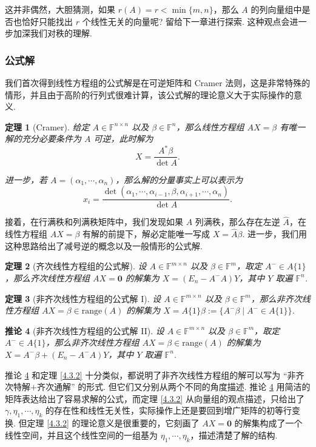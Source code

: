 \documentclass[10pt,openany]{article}
\theoremstyle{thmstyle} %
\newtheorem{theorem}{定理}[subsection]
\theoremstyle{defstyle} %
\newtheorem{corollary}[theorem]{推论}
\theoremstyle{prostyle} %
\theoremstyle{exastyle}
\theoremstyle{remstyle}
\newcommand{\F}{\mathbb{F}}
\newcommand{\n}{^{n \times n}}
\newcommand{\mn}{^{m \times n}}
\begin{document}
这并非偶然，大胆猜测，如果 \( r(A)=r<\min\{m,n\} \)，那么 \( A \) 的列向量组中是否也恰好只能找出 \( r \) 个线性无关的向量呢? 留给下一章进行探索. 这种观点会进一步加深我们对秩的理解.
 
\subsubsection{公式解}

我们首次得到线性方程组的公式解是在可逆矩阵和 Cramer 法则，这是非常特殊的情形，并且由于高阶的行列式很难计算，该公式解的理论意义大于实际操作的意义.

\begin{theorem}[Cramer]
	给定 \( A \in \F\n \) 以及 \( \beta \in \F^n \)，那么线性方程组 \( AX=\beta \) 有唯一解的充分必要条件为 \( A \) 可逆，此时解为
	\[ X=\frac{A^*\beta}{\det A}. \]
	
	进一步，若 \( A=(\alpha_1,\cdots,\alpha_n) \)，那么解的分量事实上可以表示为
	\[ x_i=\frac{\det(\alpha_1,\cdots,\alpha_{i-1},\beta,\alpha_{i+1},\cdots,\alpha_n)}{\det A}. \]
	
\end{theorem}


接着，在行满秩和列满秩矩阵中，我们发现如果 \( A \) 列满秩，那么存在左逆 \( \hat{A} \)，在线性方程组 \( AX=\beta \) 有解的前提下，解必定能唯一写成 \( X=\hat{A}\beta \). 进一步，我们用这种思路给出了减号逆的概念以及一般情形的公式解.


\begin{theorem}[齐次线性方程组的公式解] 
	设 \( A \in \F\mn \) 以及 \( \beta \in \F^m \)，取定 \( A^{-} \in A\{1\} \)，那么齐次线性方程组 \( AX=\bm{0} \) 的解集为 \( X=(E_n-A^{-}A)Y \)，其中 \( Y \) 取遍 \( \F^n \). 
\end{theorem}

\begin{theorem}[非齐次线性方程组的公式解 I]
	设 \( A \in \F\mn \) 以及 \( \beta \in \F^m \)，那么非齐次线性方程组 \( AX=\beta \in \text{range}(A) \) 的解集为 \( X=A\{1\}\beta:=\{A^{-}\beta\mid A^{-} \in A\{1\}\} \). 
\end{theorem}

\begin{corollary}[非齐次线性方程组的公式解 II] \label{4.3.8}
	设 \( A \in \F\mn \) 以及 \( \beta \in \F^m \)，取定 \( A^{-} \in A\{1\} \)，那么非齐次线性方程组 \( AX=\beta \in \text{range}(A) \) 的解集为 \( X=A^{-}\beta+(E_n-A^{-}A)Y \)，其中 \( Y \) 取遍 \( \F^n \). 
\end{corollary}


推论 \ref{4.3.8} 和定理 \ref{4.3.2} 十分类似，都说明了非齐次线性方程组的解可以写为 “非齐次特解\(+\)齐次通解” 的形式. 但它们又分别从两个不同的角度描述. 推论 \ref{4.3.8} 用简洁的矩阵表达给出了容易求解的公式，而定理 \ref{4.3.2} 从向量组的观点描述，只给出了 \( \gamma,\eta_1,\cdots,\eta_k \) 的存在性和线性无关性，实际操作上还是要回到增广矩阵的初等行变换. 但定理 \ref{4.3.2} 的理论意义是很重要的，它刻画了 \( AX=\bm{0} \) 的解集构成了一个线性空间，并且这个线性空间的一组基为 \( \eta_1,\cdots,\eta_k \)，描述清楚了解的结构.
\end{document}
